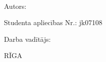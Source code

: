 \newcommand{\maketitlepagee}{
   \begin{titlepage}   
	\begin{center}
	{\Large \MakeUppercase \@universitate} \\
	{\Large \MakeUppercase \@fakultate}
	\end{center}
	\vspace{7cm}
\begin{center}

	\textbf{{\LARGE \MakeUppercase \@nosaukums}}
	\end{center}

	\vspace{0.9cm}
	\begin{center}
	{\Large \MakeUppercase \@kategorija}
	\end{center}

	\vspace{2.5cm}
	\begin{spacing}{1}
		{\raggedright \large
		Autors: \textbf{\@autors} \\
		}

		{\raggedright \large
		Studenta apliecības Nr.: jk07108 \\
		}

		{\raggedright \large
		Darba vadītājs:  \@vaditajs \\
		}
	\end{spacing}

	\vspace{5.7cm}
	\begin{center}
	{\Large RĪGA \@gads}
	\end{center}

   \end{titlepage}
}
\maketitlepagee
